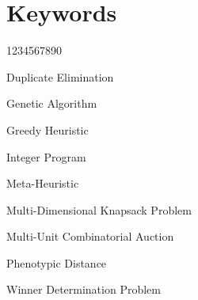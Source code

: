 %
%

\chapter{Keywords} %
\begin{labeling}{1234567890}
        \item Duplicate Elimination
        \item Genetic Algorithm
        \item Greedy Heuristic
        \item Integer Program
        \item Meta-Heuristic
        \item Multi-Dimensional Knapsack Problem
        \item Multi-Unit Combinatorial Auction
        \item Phenotypic Distance
        \item Winner Determination Problem
\end{labeling}
